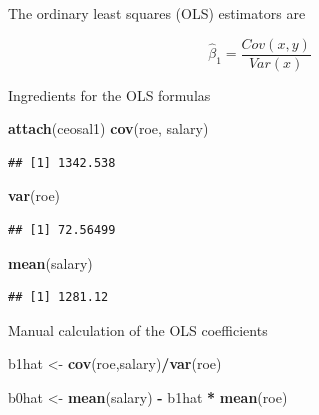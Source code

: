\documentclass[]{book}
\newenvironment{Shaded}{\begin{snugshade}}{\end{snugshade}}
\newcommand{\KeywordTok}[1]{\textcolor[rgb]{0.13,0.29,0.53}{\textbf{#1}}}
\newcommand{\NormalTok}[1]{#1}
\newcommand{\OperatorTok}[1]{\textcolor[rgb]{0.81,0.36,0.00}{\textbf{#1}}}
\newcommand{\StringTok}[1]{\textcolor[rgb]{0.31,0.60,0.02}{#1}}
\begin{document}
The ordinary least squares (OLS) estimators are

\begin{equation}
\hat{\beta}_{1} = \frac{Cov(x,y)}{Var(x)}
\label{eq:populationparameterBeta1}
\end{equation}

Ingredients for the OLS formulas

\begin{Shaded}
\begin{Highlighting}[]
\KeywordTok{attach}\NormalTok{(ceosal1)}
\KeywordTok{cov}\NormalTok{(roe, salary)}
\end{Highlighting}
\end{Shaded}

\begin{verbatim}
## [1] 1342.538
\end{verbatim}

\begin{Shaded}
\begin{Highlighting}[]
\KeywordTok{var}\NormalTok{(roe)}
\end{Highlighting}
\end{Shaded}

\begin{verbatim}
## [1] 72.56499
\end{verbatim}

\begin{Shaded}
\begin{Highlighting}[]
\KeywordTok{mean}\NormalTok{(salary)}
\end{Highlighting}
\end{Shaded}

\begin{verbatim}
## [1] 1281.12
\end{verbatim}

Manual calculation of the OLS coefficients

\begin{Shaded}
\begin{Highlighting}[]
\NormalTok{b1hat <-}\StringTok{ }\KeywordTok{cov}\NormalTok{(roe,salary)}\OperatorTok{/}\KeywordTok{var}\NormalTok{(roe)}
\end{Highlighting}
\end{Shaded}

\begin{Shaded}
\begin{Highlighting}[]
\NormalTok{b0hat <-}\StringTok{ }\KeywordTok{mean}\NormalTok{(salary) }\OperatorTok{-}\StringTok{ }\NormalTok{b1hat }\OperatorTok{*}\StringTok{ }\KeywordTok{mean}\NormalTok{(roe)}
\end{Highlighting}
\end{Shaded}
\end{document}
